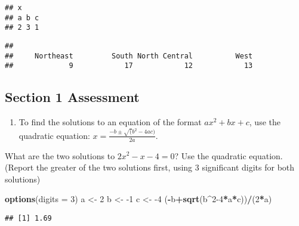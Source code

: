 \documentclass[
]{article}
\newenvironment{Shaded}{\begin{snugshade}}{\end{snugshade}}
\newcommand{\CommentTok}[1]{\textcolor[rgb]{0.56,0.35,0.01}{\textit{#1}}}
\newcommand{\DataTypeTok}[1]{\textcolor[rgb]{0.13,0.29,0.53}{#1}}
\newcommand{\DecValTok}[1]{\textcolor[rgb]{0.00,0.00,0.81}{#1}}
\newcommand{\KeywordTok}[1]{\textcolor[rgb]{0.13,0.29,0.53}{\textbf{#1}}}
\newcommand{\NormalTok}[1]{#1}
\newcommand{\OperatorTok}[1]{\textcolor[rgb]{0.81,0.36,0.00}{\textbf{#1}}}
\newcommand{\StringTok}[1]{\textcolor[rgb]{0.31,0.60,0.02}{#1}}
\providecommand{\tightlist}{%
  \setlength{\itemsep}{0pt}\setlength{\parskip}{0pt}}
\begin{document}
\begin{verbatim}
## x
## a b c 
## 2 3 1
\end{verbatim}

\begin{Shaded}
\end{Shaded}

\begin{verbatim}
## 
##     Northeast         South North Central          West 
##             9            17            12            13
\end{verbatim}

\hypertarget{section-1-assessment}{%
\subsection{Section 1 Assessment}\label{section-1-assessment}}

\begin{enumerate}
\def\labelenumi{\arabic{enumi}.}
\tightlist
\item
  To find the solutions to an equation of the format \(ax^2+bx+c\), use
  the quadratic equation: \(x=\frac{-b±\sqrt(b^2−4ac)}{2a}\).
\end{enumerate}

What are the two solutions to \(2x^2-x-4=0\)? Use the quadratic
equation. (Report the greater of the two solutions first, using 3
significant digits for both solutions)

\begin{Shaded}
\begin{Highlighting}[]
\KeywordTok{options}\NormalTok{(}\DataTypeTok{digits =} \DecValTok{3}\NormalTok{)}
\NormalTok{a <-}\StringTok{ }\DecValTok{2}
\NormalTok{b <-}\StringTok{ }\DecValTok{-1}
\NormalTok{c <-}\StringTok{ }\DecValTok{-4}
\NormalTok{(}\OperatorTok{-}\NormalTok{b}\OperatorTok{+}\KeywordTok{sqrt}\NormalTok{(b}\OperatorTok{^}\DecValTok{2-4}\OperatorTok{*}\NormalTok{a}\OperatorTok{*}\NormalTok{c))}\OperatorTok{/}\NormalTok{(}\DecValTok{2}\OperatorTok{*}\NormalTok{a)}
\end{Highlighting}
\end{Shaded}

\begin{verbatim}
## [1] 1.69
\end{verbatim}
\end{document}
